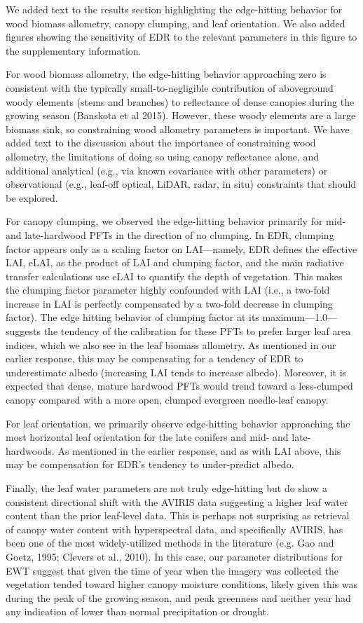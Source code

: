 We added text to the results section highlighting the edge-hitting behavior for wood biomass allometry, canopy clumping, and leaf orientation. We also added figures showing the sensitivity of EDR to the relevant parameters in this figure to the supplementary information.

For wood biomass allometry, the edge-hitting behavior approaching zero is consistent with the typically small-to-negligible contribution of aboveground woody elements (stems and branches) to reflectance of dense canopies during the growing season (Banskota et al 2015). However, these woody elements are a large biomass sink, so constraining wood allometry parameters is important. We have added text to the discussion about the importance of constraining wood allometry, the limitations of doing so using canopy reflectance alone, and additional analytical (e.g., via known covariance with other parameters) or observational (e.g., leaf-off optical, LiDAR, radar, in situ) constraints that should be explored.

For canopy clumping, we observed the edge-hitting behavior primarily for mid- and late-hardwood PFTs in the direction of no clumping. In EDR, clumping factor appears only as a scaling factor on LAI---namely, EDR defines the effective LAI, eLAI, as the product of LAI and clumping factor, and the main radiative transfer calculations use eLAI to quantify the depth of vegetation. This makes the clumping factor parameter highly confounded with LAI (i.e., a two-fold increase in LAI is perfectly compensated by a two-fold decrease in clumping factor). The edge hitting behavior of clumping factor at its maximum---1.0---suggests the tendency of the calibration for these PFTs to prefer larger leaf area indices, which we also see in the leaf biomass allometry. As mentioned in our earlier response, this may be compensating for a tendency of EDR to underestimate albedo (increasing LAI tends to increase albedo). Moreover, it is expected that dense, mature hardwood PFTs would trend toward a less-clumped canopy compared with a more open, clumped evergreen needle-leaf canopy.

For leaf orientation, we primarily observe edge-hitting behavior approaching the most horizontal leaf orientation for the late conifers and mid- and late-hardwoods. As mentioned in the earlier response, and as with LAI above, this may be compensation for EDR’s tendency to under-predict albedo.

Finally, the leaf water parameters are not truly edge-hitting but do show a consistent directional shift with the AVIRIS data suggesting a higher leaf water content than the prior leaf-level data. This is perhaps not surprising as retrieval of canopy water content with hyperspectral data, and specifically AVIRIS, has been one of the most widely-utilized methods in the literature (e.g. Gao and Goetz, 1995; Clevers et al., 2010). In this case, our parameter distributions for EWT suggest that given the time of year when the imagery was collected the vegetation tended toward higher canopy moisture conditions, likely given this was during the peak of the growing season, and peak greenness and neither year had any indication of lower than normal precipitation or drought.

